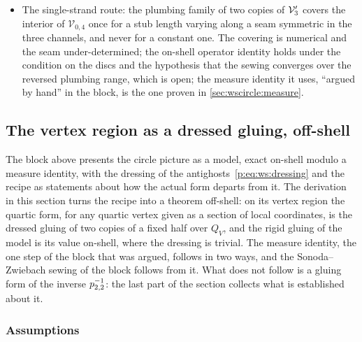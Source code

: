 \begin{itemize}
  \item The single-strand route: the plumbing family of two copies of $\mathcal{V}_{3}'$ covers the interior of $\mathcal V_{0,4}$ once for a stub length varying along a seam symmetric in the three channels, and never for a constant one.
    The covering is numerical and the seam under-determined; the on-shell operator identity holds under the condition on the discs and the hypothesis that the sewing converges over the reversed plumbing range, which is open; the measure identity it uses, ``argued by hand'' in the block, is the one proven in \cref{sec:wscircle:measure}.
\end{itemize}



\subsection{The vertex region as a dressed gluing, off-shell}
\label{sec:wscircle:offshell}


The block above presents the circle picture as a model, exact on-shell modulo a measure identity, with the dressing of the antighosts~\eqref{p:eq:ws:dressing} and the recipe as statements about how the actual form departs from it.
The derivation in this section turns the recipe into a theorem off-shell: on its vertex region the quartic form, for any quartic vertex given as a section of local coordinates, is the dressed gluing of two copies of a fixed half over $Q_V$, and the rigid gluing of the model is its value on-shell, where the dressing is trivial.
The measure identity, the one step of the block that was argued, follows in two ways, and the Sonoda--Zwiebach sewing of the block follows from it.
What does not follow is a gluing form of the inverse $p_{2,2}^{-1}$: the last part of the section collects what is established about it.

\subsubsection{Assumptions}

